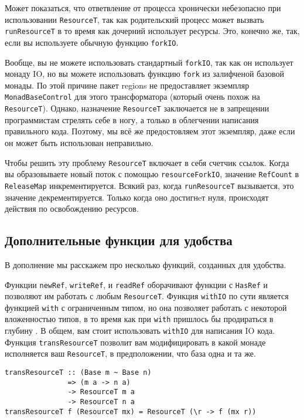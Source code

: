 Может показаться, что ответвление от процесса хронически небезопасно при использовании 
\lstinline'ResourceT', так как родительский процесс может вызвать
\lstinline'runResourceT' в то время
как дочерний использует ресурсы. Это, конечно же, так, если вы используете обычную
функцию \lstinline'forkIO'.

\begin{remark}
Вообще, вы не можете использовать стандартный \lstinline'forkIO', так как он
использует монаду
IO, но вы можете использовать функцию \lstinline'fork' из залифченой базовой монады.
По этой причине пакет regions не предоставляет экземпляр \lstinline'MonadBaseControl' для
этого
трансформатора (который очень похож на \lstinline'ResourceT'). Однако, назначение
\lstinline'ResourceT' заключается не в запрещении 
программистам стрелять себе в ногу, а только в облегчении написания
правильного кода. Поэтому, мы всё же предостовляем этот экземпляр, даже если он может быть
использован неправильно. 
\end{remark}

Чтобы решить эту проблему \lstinline'ResourceT' включает в себя
счетчик ссылок. Когда вы образовываете новый поток с помощью \lstinline'resourceForkIO',
значение \lstinline'RefCount' в \lstinline'ReleaseMap' инкрементируется. Всякий раз, когда
\lstinline'runResourceT'
вызывается, это значение декрементируется. Только когда оно достигнeт нуля, происходят
действия по освобождению ресурсов.
 
\subsection{Дополнительные функции для удобства}

В дополнение мы расскажем про несколько функций, созданных для удобства.
   
Функции \verb=newRef=, \verb=writeRef=, и \verb=readRef= оборачивают
функции с \lstinline'HasRef' и позволяют им работать с любым \lstinline'ResourceT'.
Функция \verb=withIO= по сути является функцией \verb=with= с ограниченным типом, но она 
позволяет работать с некоторой вложенностью типов, в то время как при \verb=with=
пришлось бы продираться в глубину . В общем, вам стоит
использовать \lstinline'withIO' для написания IO кода.
Функция \verb=transResourceT= позволит вам модифицировать в какой монаде исполняется ваш
\verb=ResourceT=, в предположении, что база одна и та же.
\begin{lstlisting}
transResourceT :: (Base m ~ Base n)
               => (m a -> n a)
               -> ResourceT m a
               -> ResourceT n a
transResourceT f (ResourceT mx) = ResourceT (\r -> f (mx r))
\end{lstlisting}  

